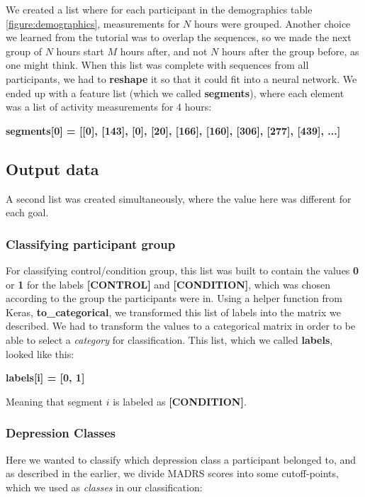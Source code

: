 We created a list where for each participant in the demographics table \ref{figure:demographics}, measurements for $N$ hours were grouped. 
Another choice we learned from the tutorial was to overlap the sequences, so we made the next group of $N$ hours start \textit{$M$} hours after, 
and not \textit{$N$} hours after the group before, as one might think. When this list was complete with sequences from all participants, we 
had to \textbf{reshape} it so that it could fit into a neural network. We ended up with a feature list (which we called \textbf{segments}), 
where each element was a list of activity measurements for 4 hours: 

\textbf{segments[0] = [[0], [143], [0], [20], [166], [160], [306], [277], [439], ...]}

\subsection{Output data}

A second list was created simultaneously, where the value here was different for each goal. 

\subsubsection{Classifying participant group}

For classifying control/condition group, this list was built to contain the values \textbf{0} or \textbf{1} for the labels \textbf{[CONTROL]} and \textbf{[CONDITION]}, which was chosen according to the group the participants were in. Using a helper function from Keras, \textbf{to\_categorical}, we transformed this list of labels into the matrix we described. We had to transform the values to a categorical matrix in order to be able to select a \textit{category} for classification. This list, which we called \textbf{labels}, looked like this: 

\textbf{labels[i] = [0, 1]}

\noindent Meaning that segment $i$ is labeled as \textbf{[CONDITION]}.

\subsubsection{Depression Classes}
Here we wanted to classify which depression class a participant belonged to, and as described in the earlier, we divide MADRS scores into some cutoff-points, which we used as \textit{classes} in our classification:

